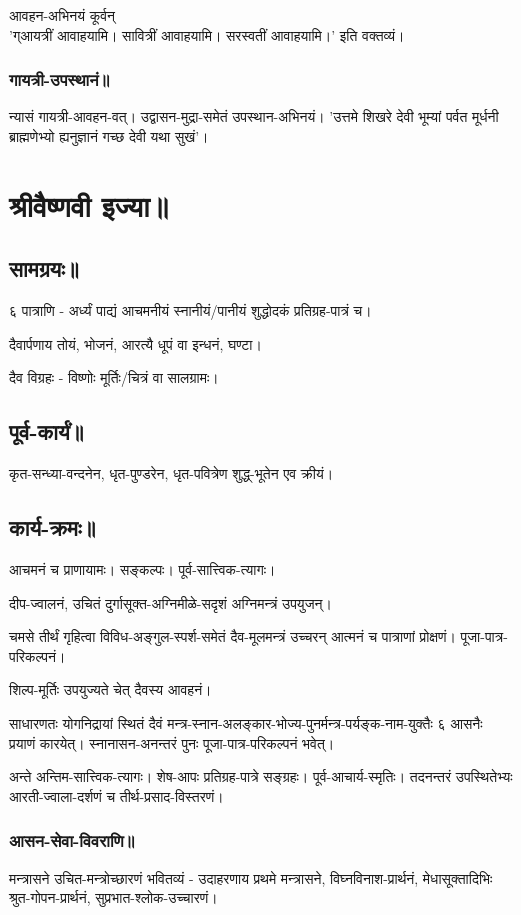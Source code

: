 \documentclass[oneside, article]{memoir}
\begin{document}
आवहन-अभिनयं कूर्वन् \\
'ग्आयत्रीं आवाहयामि। सावित्रीं आवाहयामि। सरस्वतीं आवाहयामि।' इति वक्तव्यं।

\subsection{गायत्री-उपस्थानं॥}
न्यासं गायत्री-आवहन-वत्। उद्वासन-मुद्रा-समेतं उपस्थान-अभिनयं। 'उत्तमे शिखरे देवी भूम्यां पर्वत मूर्धनी
ब्राह्मणेभ्यो ह्यनुज्ञानं गच्छ देवी यथा सुखं'।

\chapter{श्रीवैष्णवी इज्या॥}
\section{सामग्रयः॥}
६ पात्राणि - अर्ध्यं पाद्यं आचमनीयं स्नानीयं/पानीयं शुद्धोदकं प्रतिग्रह-पात्रं च।

दैवार्पणाय तोयं, भोजनं, आरत्यै धूपं वा इन्धनं, घण्टा।

दैव विग्रहः - विष्णोः मूर्तिः/चित्रं वा सालग्रामः।

\section{पूर्व-कार्यं॥}
कृत-सन्ध्या-वन्दनेन, धृत-पुण्डरेन, धृत-पवित्रेण शुद्ध्-भूतेन एव क्रीयं।

\section{कार्य-क्रमः॥}
आचमनं च प्राणायामः। सङ्कल्पः। पूर्व-सात्त्विक-त्यागः।

दीप-ज्वालनं, उचितं दुर्गासूक्त-अग्निमीळे-सदृशं अग्निमन्त्रं उपयुजन्।

चमसे तीर्थं गृहित्वा विविध-अङ्गुल-स्पर्श-समेतं दैव-मूलमन्त्रं उच्चरन् आत्मनं च पात्राणां प्रोक्षणं। पूजा-पात्र-परिकल्पनं।

शिल्प-मूर्तिः उपयुज्यते चेत् दैवस्य आवहनं।

साधारणतः योगनिद्रायां स्थितं दैवं मन्त्र-स्नान-अलङ्कार-भोज्य-पुनर्मन्त्र-पर्यङ्क-नाम-युक्तैः ६ आसनैः प्रयाणं कारयेत्। स्नानासन-अनन्तरं पुनः पूजा-पात्र-परिकल्पनं भवेत्।

अन्ते अन्तिम-सात्त्विक-त्यागः। शेष-आपः प्रतिग्रह-पात्रे सङ्ग्रहः। पूर्व-आचार्य-स्मृतिः। तदनन्तरं उपस्थितेभ्यः आरती-ज्वाला-दर्शणं च तीर्थ-प्रसाद-विस्तरणं।

\subsection{आसन-सेवा-विवराणि॥}
मन्त्रासने उचित-मन्त्रोच्छारणं भवितव्यं - उदाहरणाय प्रथमे मन्त्रासने, विघ्नविनाश-प्रार्थनं, मेधासूक्तादिभिः श्रुत-गोपन-प्रार्थनं, सुप्रभात-श्लोक-उच्चारणं।
\end{document}
